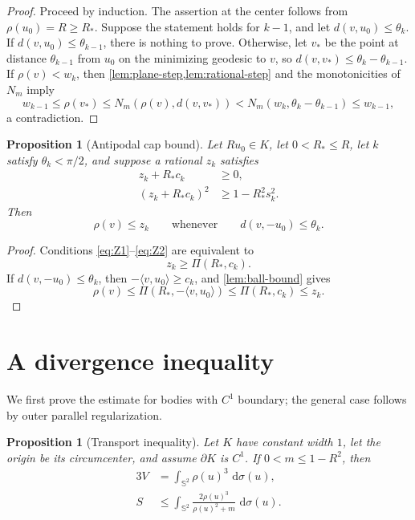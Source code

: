 \documentclass[11pt,reqno]{amsart}
\numberwithin{equation}{section}
\newtheorem{proposition}[theorem]{Proposition}
\theoremstyle{definition}
\theoremstyle{remark}
\newcommand{\Sph}{\mathbb{S}^{2}}
\newcommand{\dd}{\,\mathrm{d}}
\newcommand{\ip}[2]{\langle #1,#2\rangle}
\begin{document}
\begin{proof}
Proceed by induction. The assertion at the center follows from $\rho(u_0)=R\geq R_{*}$. Suppose the statement holds for $k-1$, and let $d(v,u_0)\leq\theta_k$. If $d(v,u_0)\leq\theta_{k-1}$, there is nothing to prove. Otherwise, let $v_{*}$ be the point at distance $\theta_{k-1}$ from $u_0$ on the minimizing geodesic to $v$, so
$d(v,v_{*})\leq\theta_k-\theta_{k-1}$. If $\rho(v)<w_k$, then \cref{lem:plane-step,lem:rational-step} and the monotonicities of $N_m$ imply
\[
 w_{k-1}\leq\rho(v_{*})
 \leq N_m(\rho(v),d(v,v_{*}))
 <N_m(w_k,\theta_k-\theta_{k-1})
 \leq w_{k-1},
\]
a contradiction.
\end{proof}

\begin{proposition}[Antipodal cap bound]\label{prop:antipodal-cap}
Let $Ru_0\in K$, let $0<R_{*}\leq R$, let $k$ satisfy $\theta_k<\pi/2$, and suppose a rational $z_k$ satisfies
\begin{align}
 z_k+R_{*}c_k&\geq0, \label{eq:Z1}\\
 (z_k+R_{*}c_k)^{2}&\geq1-R_{*}^{2}s_k^{2}. \label{eq:Z2}
\end{align}
Then
\begin{equation}\label{eq:antipodal-cap-bound}
 \rho(v)\leq z_k
 \qquad\text{whenever}\qquad
 d(v,-u_0)\leq\theta_k.
\end{equation}
\end{proposition}

\begin{proof}
Conditions \eqref{eq:Z1}--\eqref{eq:Z2} are equivalent to
\[
 z_k\geq\Pi(R_{*},c_k).
\]
If $d(v,-u_0)\leq\theta_k$, then $-\ip{v}{u_0}\geq c_k$, and
\cref{lem:ball-bound} gives
\[
 \rho(v)\leq\Pi(R_{*},-\ip{v}{u_0})\leq\Pi(R_{*},c_k)\leq z_k.
\]
\end{proof}

\section{A divergence inequality}\label{sec:transport}

We first prove the estimate for bodies with $C^{1}$ boundary; the general case follows by outer parallel regularization.

\begin{proposition}[Transport inequality]\label{prop:transport}
Let $K$ have constant width $1$, let the origin be its circumcenter, and assume $\partial K$ is $C^{1}$. If $0<m\leq1-R^{2}$, then
\begin{align}
 3V&=\int_{\Sph}\rho(u)^{3}\,\dd\sigma(u), \label{eq:radial-volume}\\
 S&\leq\int_{\Sph}\frac{2\rho(u)^{3}}{\rho(u)^{2}+m}\,\dd\sigma(u). \label{eq:transport}
\end{align}
\end{proposition}
\end{document}
